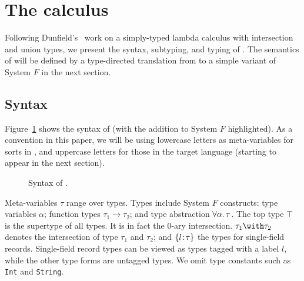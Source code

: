 \section{The \name calculus} \label{sec:fi}


Following Dunfield's~\cite{dunfield2014elaborating} work on a simply-typed
lambda calculus with intersection and union types, we present the syntax,
subtyping, and typing of \name. The semantics of \name will
be defined by a type-directed translation from \name to a simple variant of
System $F$ in the next section.

\subsection{Syntax}

Figure~\ref{fig:fi-syntax} shows the syntax of \name (with the addition to
System $F$ highlighted). As a convention in this paper, we will be using
lowercase letters as meta-variables for sorts in \name, and uppercase letters
for those in the target language (starting to appear in the next section).


\begin{figure}[h]
  
  \caption{Syntax of \name.}
  \label{fig:fi-syntax}
\end{figure}


Meta-variables $\tau$ range over types. Types include System $F$ constructs:
type variables $\alpha$; function types $\tau_1 \to \tau_2$; and type
abstraction $ \forall \alpha. \, \tau $. The top type $\top$ is the supertype of all
types. It is in fact the $0$-ary intersection. $\tau_1 \andop \tau_2$ denotes
the intersection of type $\tau_1$ and $\tau_2$; and $\{ l \!:\! \tau \}$ the types
for single-field records. Single-field record types can be viewed as types
tagged with a label $l$, while the other type forms are untagged types. We omit
type constants such as \lstinline$Int$ and \lstinline$String$.

